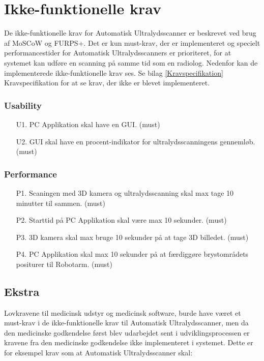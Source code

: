 \section{Ikke-funktionelle krav}
De ikke-funktionelle krav for Automatisk Ultralydsscanner er beskrevet ved brug af MoSCoW og FURPS+. Det er kun must-krav, der er implementeret og specielt performancestider for Automatisk Ultralydsscanners er prioriteret, for at systemet kan udføre en scanning på samme tid som en radiolog. Nedenfor kan de implementerede ikke-funktionelle krav ses. Se bilag \ref{Kravspecifikation} Kravspecifikation for at se krav, der ikke er blevet implementeret. 

\subsubsection{Usability}
\begin{itemize}
    \item [U1.] PC Applikation skal have en GUI. (must)
     \item[U2.] GUI skal have en procent-indikator for ultralydsscanningens gennemløb. (must)
\end{itemize}

\subsubsection{Performance}
\begin{itemize}
    \item[P1.] Scaningen med 3D kamera og ultralydsscanning skal max tage 10 minutter til sammen. (must) 
    \item[P2.] Starttid på PC Applikation skal være max 10 sekunder. (must)
    \item[P3.] 3D kamera skal max bruge 10 sekunder på at tage 3D billedet. (must)
    \item[P4.] PC Applikation skal max 10 sekunder på at færdiggøre brystområdets positurer til Robotarm. (must)
\end{itemize}

\subsection{Ekstra}
Lovkravene til medicinsk udstyr og medicinsk software, burde have været et must-krav i de ikke-funktionelle krav til Automatisk Ultralydsscanner, men da den medicinske godkendelse først blev udarbejdet sent i udviklingsprocessen er kravene fra den medicinske godkendelse ikke implementeret i systemet. Dette er for eksempel krav som at Automatisk Ultralydsscanner skal: 

